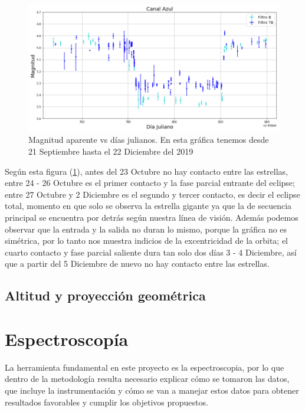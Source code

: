 \documentclass[12pt,oneside,openany,letter]{book}
\begin{document}
\begin{figure}[h]
    \centering
    \includegraphics[width=1\linewidth]{Gaficas/curva luz.png}
    \caption{Magnitud aparente vs días julianos. En esta gráfica tenemos desde 21 Septiembre hasta el 22 Diciembre del 2019}
    \label{fig:curvaluz}
\end{figure}

\noindent Según esta figura (\ref{fig:curvaluz}), antes del 23 Octubre no hay contacto entre las estrellas, entre 24 - 26 Octubre es el primer contacto y la fase parcial entrante del eclipse; entre 27 Octubre y 2 Diciembre es el segundo y tercer contacto, es decir el eclipse total, momento en que solo se observa la estrella gigante ya que la de secuencia principal se encuentra por detrás según nuestra línea de visión. Además podemos observar que la entrada y la salida no duran lo mismo, porque la gráfica no es simétrica, por lo tanto nos muestra indicios de la excentricidad de la orbita; el cuarto contacto y fase parcial saliente dura tan solo dos días 3 - 4 Diciembre, así que a partir del 5 Diciembre de nuevo no hay contacto entre las estrellas.

\subsection{Altitud y proyección geométrica}

\section{Espectroscopía} 
La herramienta fundamental en este proyecto es la espectroscopia, por lo que dentro de la metodología resulta necesario explicar cómo se tomaron las datos, que incluye la instrumentación y cómo se van a manejar estos datos para obtener resultados favorables y cumplir los objetivos propuestos.
\end{document}
